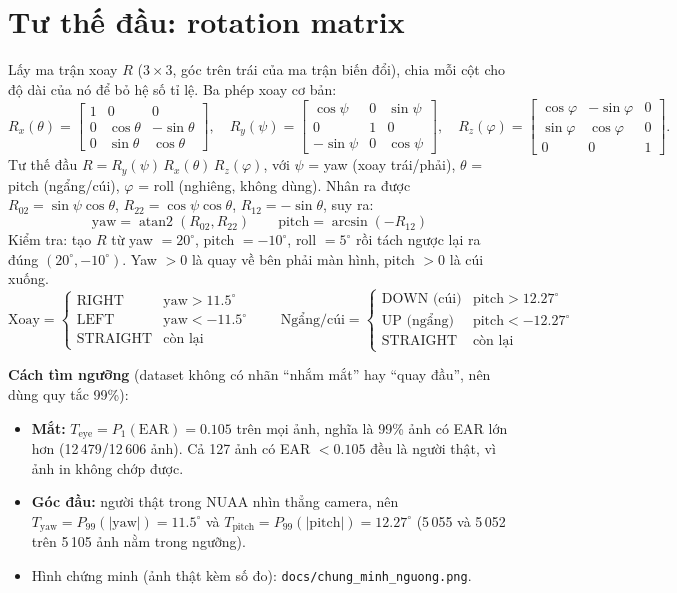 \documentclass[12pt,a4paper]{article}
\begin{document}
\section{Tư thế đầu: rotation matrix}
Lấy ma trận xoay $R$ ($3\times3$, góc trên trái của ma trận biến đổi), chia mỗi cột cho độ dài của nó để bỏ hệ số tỉ lệ. Ba phép xoay cơ bản:
\[
R_x(\theta)=\begin{bmatrix}1&0&0\\0&\cos\theta&-\sin\theta\\0&\sin\theta&\cos\theta\end{bmatrix},\quad
R_y(\psi)=\begin{bmatrix}\cos\psi&0&\sin\psi\\0&1&0\\-\sin\psi&0&\cos\psi\end{bmatrix},\quad
R_z(\varphi)=\begin{bmatrix}\cos\varphi&-\sin\varphi&0\\\sin\varphi&\cos\varphi&0\\0&0&1\end{bmatrix}.
\]
Tư thế đầu $R = R_y(\psi)\,R_x(\theta)\,R_z(\varphi)$, với $\psi$ = yaw (xoay trái/phải), $\theta$ = pitch (ngẩng/cúi), $\varphi$ = roll (nghiêng, không dùng). Nhân ra được
$R_{02}=\sin\psi\cos\theta$, $R_{22}=\cos\psi\cos\theta$, $R_{12}=-\sin\theta$, suy ra:
\[
\boxed{\text{yaw} = \operatorname{atan2}(R_{02}, R_{22})}\qquad
\boxed{\text{pitch} = \arcsin(-R_{12})}
\]
Kiểm tra: tạo $R$ từ yaw $=20^\circ$, pitch $=-10^\circ$, roll $=5^\circ$ rồi tách ngược lại ra đúng $(20^\circ, -10^\circ)$. Yaw $>0$ là quay về bên phải màn hình, pitch $>0$ là cúi xuống.
\[
\text{Xoay} =
\begin{cases}
\text{RIGHT} & \text{yaw} > 11.5^\circ\\
\text{LEFT} & \text{yaw} < -11.5^\circ\\
\text{STRAIGHT} & \text{còn lại}
\end{cases}
\qquad
\text{Ngẩng/cúi} =
\begin{cases}
\text{DOWN (cúi)} & \text{pitch} > 12.27^\circ\\
\text{UP (ngẩng)} & \text{pitch} < -12.27^\circ\\
\text{STRAIGHT} & \text{còn lại}
\end{cases}
\]

\textbf{Cách tìm ngưỡng} (dataset không có nhãn ``nhắm mắt'' hay ``quay đầu'', nên dùng quy tắc 99\%):
\begin{itemize}
  \item \textbf{Mắt:} $T_{\text{eye}} = P_1(\text{EAR}) = 0.105$ trên mọi ảnh, nghĩa là 99\% ảnh có EAR lớn hơn (12\,479/12\,606 ảnh). Cả 127 ảnh có EAR $< 0.105$ đều là người thật, vì ảnh in không chớp được.
  \item \textbf{Góc đầu:} người thật trong NUAA nhìn thẳng camera, nên $T_{\text{yaw}} = P_{99}(|\text{yaw}|) = 11.5^\circ$ và $T_{\text{pitch}} = P_{99}(|\text{pitch}|) = 12.27^\circ$ (5\,055 và 5\,052 trên 5\,105 ảnh nằm trong ngưỡng).
  \item Hình chứng minh (ảnh thật kèm số đo): \texttt{docs/chung\_minh\_nguong.png}.
\end{itemize}
\end{document}
